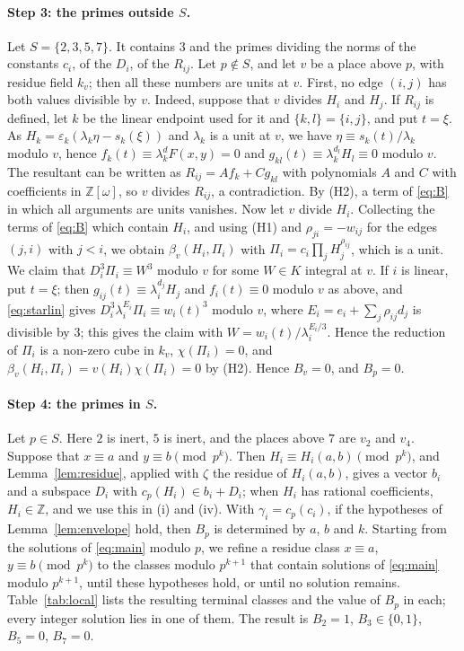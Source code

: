 \documentclass[11pt]{article}
\newcommand{\Z}{\mathbb{Z}}
\begin{document}
\paragraph{Step 3: the primes outside $S$.} Let $S=\{2,3,5,7\}$. It contains $3$ and the primes dividing the norms of the constants $c_i$, of the $D_i$, of the $R_{ij}$. Let $p\notin S$, and let $v$ be a place above $p$, with residue field $k_v$; then all these numbers are units at $v$. First, no edge $(i,j)$ has both values divisible by $v$. Indeed, suppose that $v$ divides $H_i$ and $H_j$. If $R_{ij}$ is defined, let $k$ be the linear endpoint used for it and $\{k,l\}=\{i,j\}$, and put $t=\xi$. As $H_k=\varepsilon_k(\lambda_k\eta-s_k(\xi))$ and $\lambda_k$ is a unit at $v$, we have $\eta\equiv s_k(t)/\lambda_k$ modulo $v$, hence $f_k(t)\equiv\lambda_k^dF(x,y)=0$ and $g_{kl}(t)\equiv\lambda_k^{d_l}H_l\equiv0$ modulo $v$. The resultant can be written as $R_{ij}=Af_k+Cg_{kl}$ with polynomials $A$ and $C$ with coefficients in $\Z[\omega]$, so $v$ divides $R_{ij}$, a contradiction. By (H2), a term of \eqref{eq:B} in which all arguments are units vanishes. Now let $v$ divide $H_i$. Collecting the terms of \eqref{eq:B} which contain $H_i$, and using (H1) and $\rho_{ji}=-w_{ij}$ for the edges $(j,i)$ with $j<i$, we obtain $\beta_v(H_i,\Pi_i)$ with $\Pi_i=c_i\prod_jH_j^{\rho_{ij}}$, which is a unit. We claim that $D_i^3\Pi_i\equiv W^3$ modulo $v$ for some $W\in K$ integral at $v$. If $i$ is linear, put $t=\xi$; then $g_{ij}(t)\equiv\lambda_i^{d_j}H_j$ and $f_i(t)\equiv0$ modulo $v$ as above, and \eqref{eq:starlin} gives $D_i^3\lambda_i^{E_i}\Pi_i\equiv w_i(t)^3$ modulo $v$, where $E_i=e_i+\sum_j\rho_{ij}d_j$ is divisible by $3$; this gives the claim with $W=w_i(t)/\lambda_i^{E_i/3}$. Hence the reduction of $\Pi_i$ is a non-zero cube in $k_v$, $\chi(\Pi_i)=0$, and $\beta_v(H_i,\Pi_i)=v(H_i)\chi(\Pi_i)=0$ by (H2). Hence $B_v=0$, and $B_p=0$.

\paragraph{Step 4: the primes in $S$.} Let $p\in S$. Here $2$ is inert, $5$ is inert, and the places above $7$ are $v_{2}$ and $v_{4}$. Suppose that $x\equiv a$ and $y\equiv b\pmod{p^k}$. Then $H_i\equiv H_i(a,b)\pmod{p^k}$, and Lemma~\ref{lem:residue}, applied with $\zeta$ the residue of $H_i(a,b)$, gives a vector $b_i$ and a subspace $D_i$ with $c_p(H_i)\in b_i+D_i$; when $H_i$ has rational coefficients, $H_i\in\Z$, and we use this in (i) and (iv). With $\gamma_i=c_p(c_i)$, if the hypotheses of Lemma~\ref{lem:envelope} hold, then $B_p$ is determined by $a$, $b$ and $k$. Starting from the solutions of \eqref{eq:main} modulo $p$, we refine a residue class $x\equiv a$, $y\equiv b\pmod{p^k}$ to the classes modulo $p^{k+1}$ that contain solutions of \eqref{eq:main} modulo $p^{k+1}$, until these hypotheses hold, or until no solution remains. Table~\ref{tab:local} lists the resulting terminal classes and the value of $B_p$ in each; every integer solution lies in one of them. The result is $B_{2}=1$, $B_{3}\in\{0,1\}$, $B_{5}=0$, $B_{7}=0$.
\end{document}
